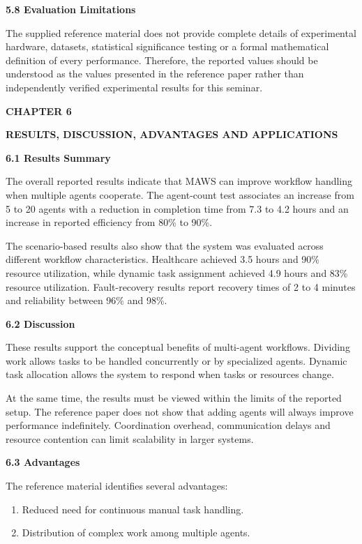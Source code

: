 \documentclass[12pt,letterpaper]{article}
\newcommand{\chaptertitle}[2]{%
  \begin{center}
    {\fontsize{15pt}{18pt}\selectfont\bfseries #1\par}%
    \vspace{2pt}%
    {\fontsize{15pt}{18pt}\selectfont\bfseries #2\par}%
  \end{center}%
  \vspace{10pt}%
}
\newcommand{\sectiontitle}[1]{%
  \vspace{6pt}%
  {\noindent\fontsize{13.2pt}{16pt}\selectfont\bfseries #1\par}%
  \vspace{2pt}%
}
\newcommand{\bodytextstyle}{\fontsize{11.3pt}{25.8pt}\selectfont}
\begin{document}
\bodytextstyle
\sectiontitle{5.8 Evaluation Limitations}
The supplied reference material does not provide complete details of experimental hardware, datasets, statistical significance testing or a formal mathematical definition of every performance. Therefore, the reported values should be understood as the values presented in the reference paper rather than independently verified experimental results for this seminar.
\newpage

\bodytextstyle
\chaptertitle{CHAPTER 6}{RESULTS, DISCUSSION, ADVANTAGES AND APPLICATIONS}

\sectiontitle{6.1 Results Summary}
The overall reported results indicate that MAWS can improve workflow handling when multiple agents cooperate. The agent-count test associates an increase from 5 to 20 agents with a reduction in completion time from 7.3 to 4.2 hours and an increase in reported efficiency from 80\% to 90\%.

The scenario-based results also show that the system was evaluated across different workflow characteristics. Healthcare achieved 3.5 hours and 90\% resource utilization, while dynamic task assignment achieved 4.9 hours and 83\% resource utilization. Fault-recovery results report recovery times of 2 to 4 minutes and reliability between 96\% and 98\%.

\sectiontitle{6.2 Discussion}
These results support the conceptual benefits of multi-agent workflows. Dividing work allows tasks to be handled concurrently or by specialized agents. Dynamic task allocation allows the system to respond when tasks or resources change.

At the same time, the results must be viewed within the limits of the reported setup. The reference paper does not show that adding agents will always improve performance indefinitely. Coordination overhead, communication delays and resource contention can limit scalability in larger systems.

\sectiontitle{6.3 Advantages}
The reference material identifies several advantages:
\begin{enumerate}[leftmargin=20pt, label=\arabic*., itemsep=3pt, parsep=0pt, topsep=2pt]
\item Reduced need for continuous manual task handling.
\item Distribution of complex work among multiple agents.
\end{enumerate}
\newpage
\end{document}
